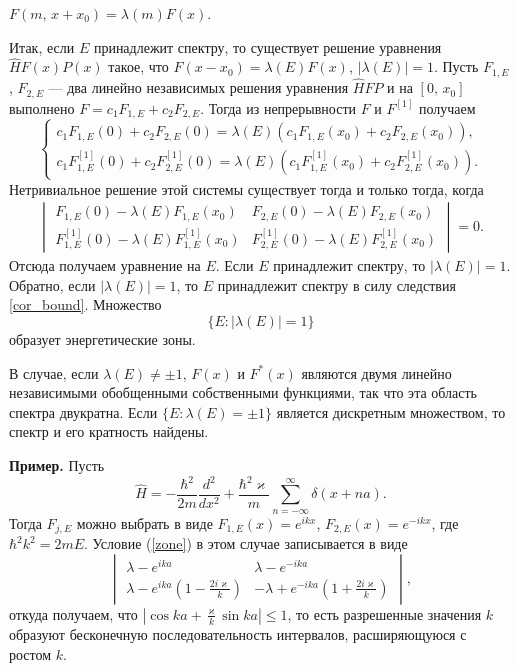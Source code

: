 \documentclass[a4paper
]{article}
\begin{document}
$F(m, \, x+x_0)=\lambda(m)F(x)$. \par
Итак, если $E$ принадлежит спектру, то существует решение уравнения
$\hat HF(x)P(x)$ такое, что $F(x-x_0)=\lambda(E)F(x)$, $|\lambda(E)|
=1$. Пусть $F_{1,E}$, $F_{2,E}$ --- два линейно независимых решения
уравнения $\hat HFP$ и на $[0, \, x_0]$ выполнено $F=c_1F_{1,E}+c_2F_{2,E}$.
Тогда из непрерывности $F$ и $F^{[1]}$ получаем $$\left\{ \begin{array}{l}
c_1F_{1,E}(0)+c_2F_{2,E}(0)=\lambda(E)(c_1F_{1,E}(x_0)+c_2F_{2,E}(x_0)),
\\ c_1F_{1,E}^{[1]}(0)+c_2F_{2,E}^{[1]}(0)=\lambda(E)(c_1F_{1,E}^{[1]}
(x_0)+c_2F_{2,E}^{[1]}(x_0)).\end{array}\right.$$ Нетривиальное решение
этой системы существует тогда и только тогда, когда
\begin{align}
\label{zone}
\begin{vmatrix} F_{1,E}(0)-\lambda(E)F_{1,E}(x_0) &
F_{2,E}(0)-\lambda(E)F_{2,E}(x_0) \\ F_{1,E}^{[1]}(0)-\lambda(E)F_{1,E}
^{[1]}(x_0) & F_{2,E}^{[1]}(0)-\lambda(E)F_{2,E}^{[1]}(x_0)
\end{vmatrix}=0.
\end{align}
Отсюда получаем уравнение на $E$. Если $E$ принадлежит спектру, то
$|\lambda(E)|=1$. Обратно, если $|\lambda(E)|=1$, то $E$ принадлежит
спектру в силу следствия \ref{cor_bound}. Множество $$\{E:|\lambda(E)|=1\}$$
образует энергетические зоны. \par
В случае, если $\lambda(E)\ne \pm 1$, $F(x)$ и $F^*(x)$ являются двумя
линейно независимыми обобщенными собственными функциями, так что
эта область спектра двукратна. Если $\{E:\lambda(E)=\pm 1\}$ является
дискретным множеством, то спектр и его кратность найдены. \par
{\bf Пример.} Пусть $$\hat H=-\frac{\hbar^2}{2m}\frac{d^2}{dx^2}+
\frac{\hbar^2\varkappa}{m}\sum \limits_{n=-\infty}^\infty \delta(x+na).$$
Тогда $F_{j,E}$ можно выбрать в виде $F_{1,E}(x)=e^{ikx}$, $F_{2,E}(x)=e^{-ikx}$,
где $\hbar^2k^2=2mE$. Условие (\ref{zone}) в этом случае
записывается в виде $$\begin{vmatrix} \lambda-e^{ika} & \lambda-e^{-ika}
\\ \lambda-e^{ika}\left(1-\frac{2i\varkappa}{k}\right) & -\lambda+
e^{-ika}\left(1+\frac{2i\varkappa}{k}\right)\end{vmatrix},$$ откуда
получаем, что $|\cos ka+\frac{\varkappa}{k}\sin ka|\le 1$, то есть
разрешенные значения $k$ образуют бесконечную последовательность
интервалов, расширяющуюся с ростом $k$.
\end{document}
